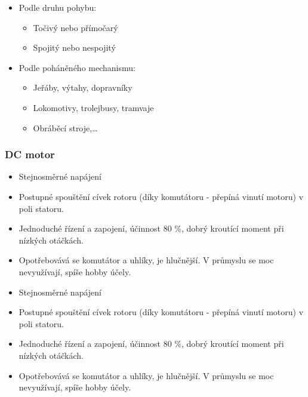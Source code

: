 \begin{itemize}
    \item Podle druhu pohybu: \begin{itemize}
              \item Točivý nebo přímočarý
              \item Spojitý nebo nespojitý
          \end{itemize}
    \item Podle poháněného mechanismu: \begin{itemize}
              \item Jeřáby, výtahy, dopravníky
              \item Lokomotivy, trolejbusy, tramvaje
              \item Obráběcí stroje,\dots
          \end{itemize}
\end{itemize}

\subsubsection*{DC motor}
\begin{itemize}
  \item Stejnosměrné napájení
  \item Postupné spouštění cívek rotoru (díky komutátoru - přepíná vinutí motoru) v poli statoru.
  \item Jednoduché řízení a zapojení, účinnost 80 \%, dobrý kroutící moment při nízkých otáčkách.
  \item Opotřebovává se komutátor a uhlíky, je hlučnější. V průmyslu se moc nevyužívají, spíše hobby účely.
    \item Stejnosměrné napájení
    \item Postupné spouštění cívek rotoru (díky komutátoru - přepíná vinutí motoru) v poli statoru.
    \item Jednoduché řízení a zapojení, účinnost 80 \%, dobrý kroutící moment při nízkých otáčkách.
    \item Opotřebovává se komutátor a uhlíky, je hlučnější. V průmyslu se moc nevyužívají, spíše hobby účely.
\end{itemize}

